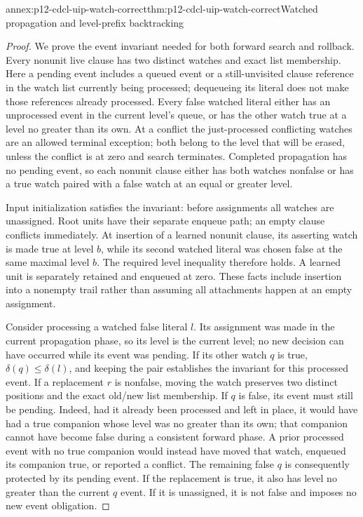 \begin{annexitem}{annex:p12-cdcl-uip-watch-correct}{thm:p12-cdcl-uip-watch-correct}{Watched propagation and level-prefix backtracking}
\begin{proof}
We prove the event invariant needed for both forward search and rollback.
Every nonunit live clause has two distinct watches and exact list membership.
Here a pending event includes a queued event or a still-unvisited clause
reference in the watch list currently being processed; dequeueing its literal
does not make those references already processed.
Every false watched literal either has an unprocessed event in the current
level's queue, or has the other watch true at a level no greater than its own.
At a conflict the just-processed conflicting watches are an allowed terminal
exception; both belong to the level that will be erased, unless the conflict
is at zero and search terminates.  Completed propagation has no pending
event, so each nonunit clause either has both watches nonfalse or has a true
watch paired with a false watch at an equal or greater level.

Input initialization satisfies the invariant: before assignments all watches
are unassigned.  Root units have their separate enqueue path; an empty clause
conflicts immediately.  At insertion of a learned nonunit clause, its asserting
watch is made true at level \(b\), while its second watched literal was
chosen false at the same maximal level \(b\).  The required level inequality
therefore holds.  A learned unit is separately retained and enqueued at zero.
These facts include insertion into a nonempty trail rather than assuming all
attachments happen at an empty assignment.

Consider processing a watched false literal \(l\).  Its assignment was made
in the current propagation phase, so its level is the current level; no new
decision can have occurred while its event was pending.  If its other watch
\(q\) is true, \(\delta(q)\leq\delta(l)\), and keeping the pair
establishes the invariant for this processed event.  If a replacement \(r\)
is nonfalse, moving the watch preserves two distinct positions and the exact
old/new list membership.  If \(q\) is false, its event must still be pending.
Indeed, had it already been processed and left in place, it would have had a
true companion whose level was no greater than its own; that companion
cannot have become false during a consistent forward phase.  A prior
processed event with no true companion would instead have moved that watch,
enqueued its companion true, or reported a conflict.  The remaining false
\(q\) is consequently protected by its pending event.  If the replacement
is true, it also has level no greater than the current \(q\) event.  If it
is unassigned, it is not false and imposes no new event obligation.


\end{proof}
\end{annexitem}
